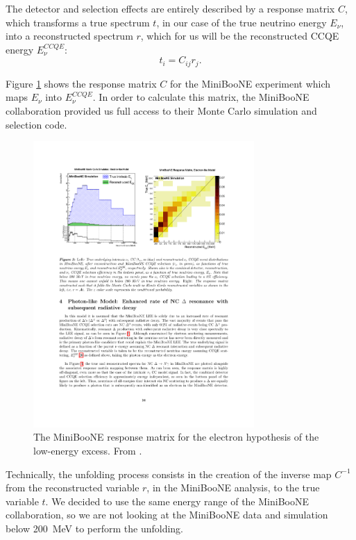 The detector and selection effects are entirely described by a response matrix $C$, which transforms a true spectrum $t$, in our case of the true neutrino energy $E_{\nu}$, into a reconstructed spectrum $r$, which for us will be the reconstructed CCQE energy $E_{\nu}^{CCQE}$:
\begin{equation}
    t_i = C_{ij} r_j.
\end{equation}

Figure \ref{fig:lee_map} shows the response matrix $C$ for the MiniBooNE experiment which maps $E_{\nu}$ into $E_{\nu}^{CCQE}$. In order to calculate this matrix, the MiniBooNE collaboration provided us full access to their Monte Carlo simulation and selection code.

\begin{figure}[htbp]
\centering
\includegraphics[width=0.75\textwidth]{figures/lee_map.pdf} 
\caption{The MiniBooNE response matrix for the electron hypothesis of the low-energy excess. From \cite{lee_unfolding}.} 
\label{fig:lee_map}
\end{figure}

Technically, the unfolding process consists in the creation of the inverse map $C^{-1}$ from the reconstructed variable $r$, in the MiniBooNE analysis, to the true variable $t$. We decided to use the same energy range of the MiniBooNE collaboration, so we are not looking at the MiniBooNE data and simulation below 200~MeV to perform the unfolding.

